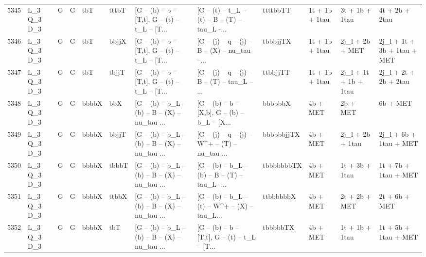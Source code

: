 \begin{tabular}{llllllllllll}
5345 &  L\_3 Q\_3 D\_3 &     G &     G &         tbT &       tttbT &  [G -- (b) -- b -- [T,t], G -- (t) -- t\_L -- [T... &  [G -- (t) -- t\_L -- (t) -- B -- (T) -- tau\_L -... &    ttttbbTT &           1t + 1b + 1tau &           3t + 1b + 1tau &                     4t + 2b + 2tau \\
5346 &  L\_3 Q\_3 D\_3 &     G &     G &         tbT &       bbjjX &  [G -- (b) -- b -- [T,t], G -- (t) -- t\_L -- [T... &  [G -- (j) -- q -- (j) -- B -- (X) -- nu\_tau --... &    tbbbjjTX &           1t + 1b + 1tau &          2j\_l + 2b + MET &        2j\_l + 1t + 3b + 1tau + MET \\
5347 &  L\_3 Q\_3 D\_3 &     G &     G &         tbT &       tbjjT &  [G -- (b) -- b -- [T,t], G -- (t) -- t\_L -- [T... &  [G -- (j) -- q -- (j) -- B -- (T) -- tau\_L -- ... &    ttbbjjTT &           1t + 1b + 1tau &    2j\_l + 1t + 1b + 1tau &              2j\_l + 2t + 2b + 2tau \\
5348 &  L\_3 Q\_3 D\_3 &     G &     G &       bbbbX &         bbX &  [G -- (b) -- b\_L -- (b) -- B -- (X) -- nu\_tau ... &  [G -- (b) -- b -- [X,b], G -- (b) -- b\_L -- [X... &     bbbbbbX &                 4b + MET &                 2b + MET &                           6b + MET \\
5349 &  L\_3 Q\_3 D\_3 &     G &     G &       bbbbX &       bbjjT &  [G -- (b) -- b\_L -- (b) -- B -- (X) -- nu\_tau ... &  [G -- (j) -- q -- (j) -- W\textasciicircum + -- (T) -- nu\_tau ... &  bbbbbbjjTX &                 4b + MET &         2j\_l + 2b + 1tau &             2j\_l + 6b + 1tau + MET \\
5350 &  L\_3 Q\_3 D\_3 &     G &     G &       bbbbX &       tbbbT &  [G -- (b) -- b\_L -- (b) -- B -- (X) -- nu\_tau ... &  [G -- (b) -- b\_L -- (b) -- B -- (T) -- tau\_L -... &  tbbbbbbbTX &                 4b + MET &           1t + 3b + 1tau &               1t + 7b + 1tau + MET \\
5351 &  L\_3 Q\_3 D\_3 &     G &     G &       bbbbX &       ttbbX &  [G -- (b) -- b\_L -- (b) -- B -- (X) -- nu\_tau ... &  [G -- (b) -- b\_L -- (t) -- W\textasciicircum + -- (X) -- tau\_L... &   ttbbbbbbX &                 4b + MET &            2t + 2b + MET &                      2t + 6b + MET \\
5352 &  L\_3 Q\_3 D\_3 &     G &     G &       bbbbX &         tbT &  [G -- (b) -- b\_L -- (b) -- B -- (X) -- nu\_tau ... &  [G -- (b) -- b -- [T,t], G -- (t) -- t\_L -- [T... &    tbbbbbTX &                 4b + MET &           1t + 1b + 1tau &               1t + 5b + 1tau + MET \\

\end{tabular}
